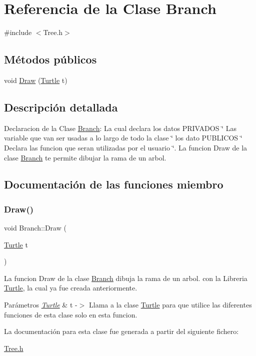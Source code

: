\hypertarget{class_branch}{}\section{Referencia de la Clase Branch}
\label{class_branch}


{\ttfamily \#include $<$Tree.\+h$>$}

\subsection*{Métodos públicos}
\begin{DoxyCompactItemize}
\item 
void \mbox{\hyperlink{class_branch_ad60d81c37e6940c37856058c83efa5f3}{Draw}} (\mbox{\hyperlink{class_turtle}{Turtle}} t)
\end{DoxyCompactItemize}


\subsection{Descripción detallada}
Declaracion de la Clase \mbox{\hyperlink{class_branch}{Branch}}\+: La cual declara los datos P\+R\+I\+V\+A\+D\+OS \char`\"{} Las variable que van ser usadas a lo largo de todo la clase \char`\"{} los dato P\+U\+B\+L\+I\+C\+OS \char`\"{} Declara las funcion que seran utilizadas por el usuario \char`\"{}. La funcion Draw de la clase \mbox{\hyperlink{class_branch}{Branch}} te permite dibujar la rama de un arbol. 

\subsection{Documentación de las funciones miembro}
\mbox{\label{class_branch_ad60d81c37e6940c37856058c83efa5f3}} 
\subsubsection{\texorpdfstring{Draw()}{Draw()}}
{\footnotesize\ttfamily void Branch\+::\+Draw (\begin{DoxyParamCaption}\item[{\mbox{\hyperlink{class_turtle}{Turtle}}}]{t }\end{DoxyParamCaption})\hspace{0.3cm}{\ttfamily [inline]}}

La funcion Draw de la clase \mbox{\hyperlink{class_branch}{Branch}} dibuja la rama de un arbol. con la Libreria \mbox{\hyperlink{class_turtle}{Turtle}}, la cual ya fue creada anteriormente.
\begin{DoxyParams}{Parámetros}
{\em \mbox{\hyperlink{class_turtle}{Turtle}}} & t -\/$>$ Llama a la clase \mbox{\hyperlink{class_turtle}{Turtle}} para que utilice las diferentes funciones de esta clase solo en esta funcion. \\
\hline
\end{DoxyParams}


La documentación para esta clase fue generada a partir del siguiente fichero\+:\begin{DoxyCompactItemize}
\item 
\mbox{\hyperlink{_tree_8h}{Tree.\+h}}\end{DoxyCompactItemize}

